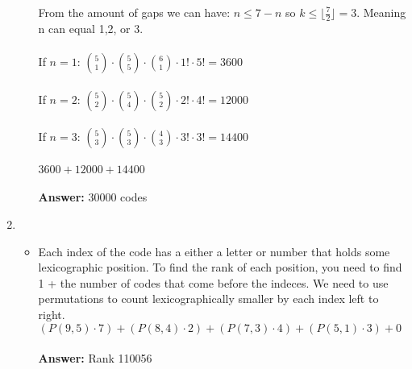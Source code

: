 \documentclass[11pt]{article}
\begin{document}
\begin{enumerate}[label=(\alph*)]
\begin{itemize}
            From the amount of gaps we can have: \(n \leq 7-n\) so \(k \leq \lfloor \frac{7}{2} \rfloor = 3\). Meaning n can equal 1,2, or 3. \\ \\
            If \(n = 1\): \(\binom{5}{1} \cdot \binom{5}{5} \cdot \binom{6}{1} \cdot 1! \cdot 5! = 3600\) \\ \\
            If \(n = 2\): \(\binom{5}{2} \cdot \binom{5}{4} \cdot \binom{5}{2} \cdot 2! \cdot 4! = 12000\) \\ \\
            If \(n = 3\): \(\binom{5}{3} \cdot \binom{5}{3} \cdot \binom{4}{3} \cdot 3! \cdot 3! = 14400\) \\ \\
            \(3600+12000+14400\) \\ \\
            \textbf{Answer:} 30000 codes
        \end{itemize}
        \item
        \begin{itemize}
            \item[] Each index of the code has a either a letter or number that holds some lexicographic position. To find the rank of each position, you need to find 1 + the number of codes that come before the indeces. We need to use permutations to count lexicographically smaller by each index left to right. \\
            \((P(9,5) \cdot 7) + (P(8,4) \cdot 2) + (P(7,3) \cdot 4) + (P(5,1) \cdot 3) + 0\) \\ \\
            \textbf{Answer:} Rank 110056
        \end{itemize}
    \end{enumerate}
\end{document}
